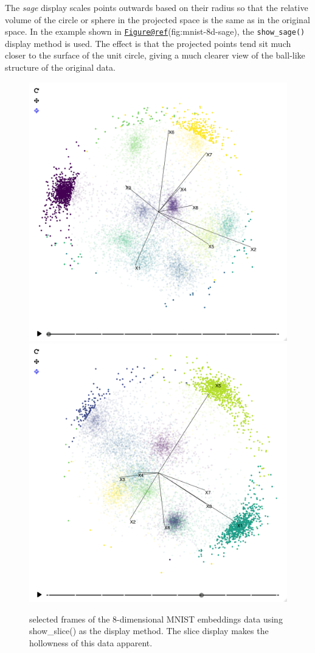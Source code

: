 The \emph{sage} display scales points outwards based on their radius so
that the relative volume of the circle or sphere in the projected space
is the same as in the original space. In the example shown in
\href{mailto:Figure@ref}{\nolinkurl{Figure@ref}}(fig:mnist-8d-sage), the
\texttt{show\_sage()} display method is used. The effect is that the
projected points tend sit much closer to the surface of the unit circle,
giving a much clearer view of the ball-like structure of the original
data.

\begin{Schunk}
\begin{figure}

{\centering \includegraphics[width=0.49\linewidth]{figures/mnist/mnist-8d-slice-1} \includegraphics[width=0.49\linewidth]{figures/mnist/mnist-8d-slice-2} 

}

\caption[selected frames of the 8-dimensional MNIST embeddings data using show\_slice() as the display method]{selected frames of the 8-dimensional MNIST embeddings data using show\_slice() as the display method. The slice display makes the hollowness of this data apparent.}\label{fig:mnist-8d-slice}
\end{figure}
\end{Schunk}

